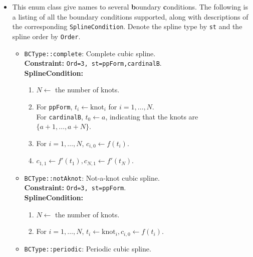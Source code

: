 \documentclass[12pt]{article}
\begin{document}
    \begin{itemize}
        \item This enum class give names to several \textbf{b}oundary \textbf{c}onditions. 
              The following is a listing of all the boundary conditions supported, along with descriptions
              of the corresponding \texttt{SplineCondition}. Denote the spline type by \texttt{st} and the
              spline order by \texttt{Order}.
              \begin{itemize}
                  \item \texttt{BCType::complete}: Complete cubic spline. \\
                        \textbf{Constraint:} \texttt{Ord=3, st=ppForm,cardinalB}. \\
                        \textbf{SplineCondition:}
                        \begin{enumerate}
                            \item \(N\leftarrow\) the number of knots.
                            \item For \texttt{ppForm}, \(t_i\leftarrow \text{knot}_i\) for \(i=1,\dots, N\). \\
                                  For \texttt{cardinalB}, \(t_0\leftarrow a\), indicating that the knots are \(\{a+1,\dots, a+N\}\).
                            \item For \(i=1,\dots,N\), \(c_{i,0}\leftarrow f(t_i)\). 
                            \item \(c_{1,1}\leftarrow f'(t_1),c_{N,1}\leftarrow f'(t_N)\).
                        \end{enumerate}
                  \item \texttt{BCType::notAknot}: Not-a-knot cubic spline. \\
                        \textbf{Constraint:} \texttt{Ord=3, st=ppForm}. \\
                        \textbf{SplineCondition:}
                        \begin{enumerate}
                            \item \(N\leftarrow\) the number of knots.
                            \item For \(i=1,\dots,N\), \(t_i\leftarrow \text{knot}_i, c_{i,0}\leftarrow f(t_i)\).
                        \end{enumerate}
                  \item \texttt{BCType::periodic}: Periodic cubic spline. \\

\end{itemize}
\end{itemize}
\end{document}

